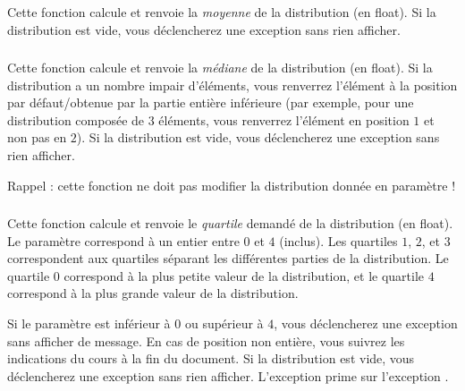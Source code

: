 \subsubsection*{}

\noindent Cette fonction calcule et renvoie la \textit{moyenne} de la distribution (en float).
Si la distribution est vide, vous déclencherez une exception  sans rien afficher.


\subsubsection*{}

\noindent Cette fonction calcule et renvoie la \textit{médiane} de la distribution (en float).
Si la distribution a un nombre impair d'éléments, vous renverrez l'élément à la position par défaut/obtenue par la partie entière inférieure (par exemple, pour une distribution composée de $ 3 $ éléments, vous renverrez l'élément en position $ 1 $ et non pas en $ 2 $).
Si la distribution est vide, vous déclencherez une exception  sans rien afficher.

\medskip

\noindent Rappel : cette fonction ne doit pas modifier la distribution donnée en paramètre !


\subsubsection*{}

\noindent Cette fonction calcule et renvoie le \textit{quartile} demandé de la distribution (en float).
Le paramètre  correspond à un entier entre $ 0 $ et $ 4 $ (inclus).
Les quartiles $ 1 $, $ 2 $, et $ 3 $ correspondent aux quartiles séparant les différentes parties de la distribution.
Le quartile $ 0 $ correspond à la plus petite valeur de la distribution, et le quartile $ 4 $ correspond à la plus grande valeur de la distribution.

\noindent Si le paramètre  est inférieur à $ 0 $ ou supérieur à $ 4 $, vous déclencherez une exception  sans afficher de message.
En cas de position non entière, vous suivrez les indications du cours à la fin du document.
Si la distribution est vide, vous déclencherez une exception  sans rien afficher.
L'exception  prime sur l'exception .

